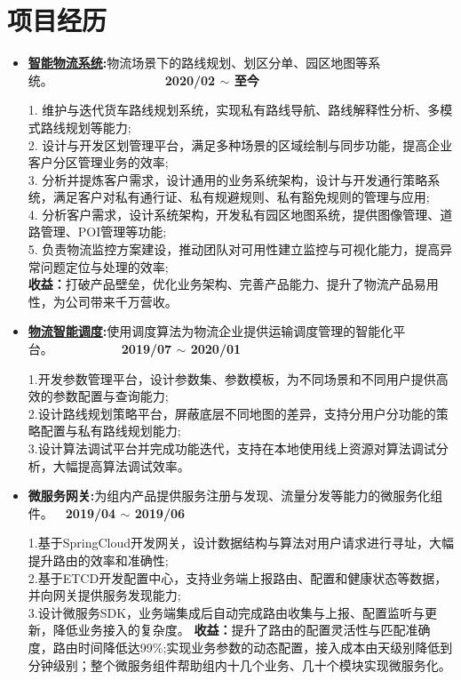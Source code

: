 \documentclass[letterpaper, UTF8, 11pt]{article}
\begin{document}
	\section*{\textbf{项目经历}}\vspace{-0.1in}
	\begin{itemize}	
		\item \textbf{\href{https://lbsyun.baidu.com/solutions/logisticsmap}{智能物流系统}:}{物流场景下的路线规划、划区分单、园区地图等系统。}~~~~~~~~~~~~~~~~~~\textbf{2020/02 $\sim$ 至今}
		
		1. 维护与迭代货车路线规划系统，实现私有路线导航、路线解释性分析、多模式路线规划等能力;\\
		2. 设计与开发区划管理平台，满足多种场景的区域绘制与同步功能，提高企业客户分区管理业务的效率;\\
		3. 分析并提炼客户需求，设计通用的业务系统架构，设计与开发通行策略系统，满足客户对私有通行证、私有规避规则、私有豁免规则的管理与应用;\\
		4. 分析客户需求，设计系统架构，开发私有园区地图系统，提供图像管理、道路管理、POI管理等功能;\\
		5. 负责物流监控方案建设，推动团队对可用性建立监控与可视化能力，提高异常问题定位与处理的效率;\\
		\textbf{收益：}打破产品壁垒，优化业务架构、完善产品能力、提升了物流产品易用性，为公司带来千万营收。
		
		\vspace{0.05in}

		\item \textbf{\href{https://lbsyun.baidu.com/solutions/scheduling}{物流智能调度}:}{使用调度算法为物流企业提供运输调度管理的智能化平台。}~~~~~~~~~~~\textbf{2019/07 $\sim$ 2020/01}
		
		1.开发参数管理平台，设计参数集、参数模板，为不同场景和不同用户提供高效的参数配置与查询能力;\\
		2.设计路线规划策略平台，屏蔽底层不同地图的差异，支持分用户分功能的策略配置与私有路线规划能力;\\
		3.设计算法调试平台并完成功能迭代，支持在本地使用线上资源对算法调试分析，大幅提高算法调试效率。
		
		\vspace{0.05in}

		\item \textbf{微服务网关:}{为组内产品提供服务注册与发现、流量分发等能力的微服务化组件。}~~\textbf{2019/04 $\sim$ 2019/06}
		
		1.基于SpringCloud开发网关，设计数据结构与算法对用户请求进行寻址，大幅提升路由的效率和准确性;\\
		2.基于ETCD开发配置中心，支持业务端上报路由、配置和健康状态等数据，并向网关提供服务发现能力;\\
		3.设计微服务SDK，业务端集成后自动完成路由收集与上报、配置监听与更新，降低业务接入的复杂度。
		\textbf{收益：}提升了路由的配置灵活性与匹配准确度，路由时间降低达99\%;实现业务参数的动态配置，接入成本由天级别降低到分钟级别；整个微服务组件帮助组内十几个业务、几十个模块实现微服务化。
		

\end{itemize}
\end{document}
